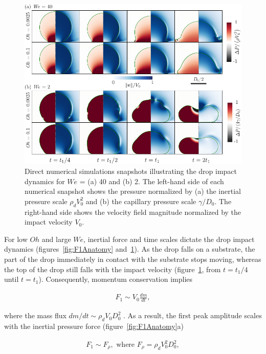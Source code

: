\documentclass{jfm}
\begin{document}
	\begin{figure}
		\centering
		\includegraphics[width=\textwidth]{F1_Drops_LowOh_v2.pdf}
		\caption{Direct numerical simulations snapshots illustrating the drop impact dynamics for $We$ = (a) 40 and (b) 2. The left-hand side of each numerical snapshot shows the pressure normalized by (a) the inertial pressure scale $\rho_dV_0^2$ and (b) the capillary pressure scale $\gamma/D_0$. The right-hand side shows the velocity field magnitude normalized by the impact velocity $V_0$.}
		\label{fig:F1AnatomyLowOh}
	\end{figure}
	
	For low $Oh$ and large $We$, inertial force and time scales dictate the drop impact dynamics (figures~\ref{fig:F1Anatomy} and~\ref{fig:F1AnatomyLowOh}). As the drop falls on a substrate, the part of the drop immediately in contact with the substrate stops moving, whereas the top of the drop still falls with the impact velocity (figure~\ref{fig:F1AnatomyLowOh}, from $t = t_1/4$ until $t = t_1$). Consequently, momentum conservation implies 
	
	\begin{align}
		F_1 \sim V_0\frac{dm}{dt},
	\end{align}
	
	\noindent where the mass flux $dm/dt \sim \rho_d V_0D_0^2$ \citep{Soto2014, zhang2022impact}. As a result, the first peak amplitude scales with the inertial pressure force (figure~\ref{fig:F1Anatomy}a)
	
	\begin{align}\label{eq:F1}
		F_1 \sim F_\rho,\text{ where }F_\rho =  \rho_d V_0^2D_0^2,
	\end{align}
	
\end{document}
